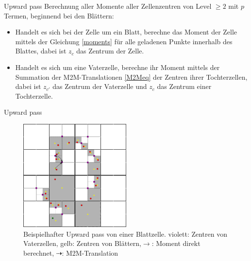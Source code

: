 \documentclass[ngerman]{beamer}
\begin{document}
\begin{frame}{Upward pass}
Berechnung aller Momente aller Zellenzentren von Level $\geq 2$ mit $p$ Termen, beginnend bei den Blättern:
\begin{itemize}
\item Handelt es sich bei der Zelle um ein Blatt, berechne das Moment der Zelle mittels der Gleichung \eqref{moments} für alle geladenen Punkte innerhalb des Blattes, dabei ist $z_c$ das Zentrum der Zelle.
\item Handelt es sich um eine Vaterzelle, berechne ihr Moment mittels der Summation der M2M-Translationen \eqref{M2Meq} der Zentren ihrer Tochterzellen, dabei ist $z_{c'}$ das Zentrum der Vaterzelle und $z_c$ das Zentrum einer Tochterzelle.
\end{itemize}
\end{frame}

\begin{frame}{Upward pass}
\begin{figure}
\includegraphics[width=0.5\textwidth]{upward.png}
\caption{Beispielhafter Upward pass von einer Blattzelle. \linebreak violett: Zentren von Vaterzellen, gelb: Zentren von Blättern,\linebreak $\rightarrow$: Moment direkt berechnet, $\dashrightarrow$: M2M-Translation}
\end{figure}
\end{frame}
\end{document}
